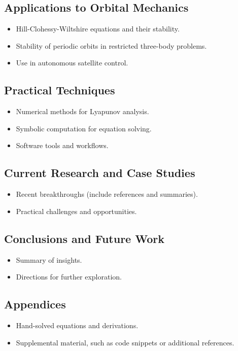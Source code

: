 \documentclass[11pt]{article}
\begin{document}
\subsection{Applications to Orbital Mechanics}
\begin{itemize}
    \item Hill-Clohessy-Wiltshire equations and their stability.
    \item Stability of periodic orbits in restricted three-body problems.
    \item Use in autonomous satellite control.
\end{itemize}

\subsection{Practical Techniques}
\begin{itemize}
    \item Numerical methods for Lyapunov analysis.
    \item Symbolic computation for equation solving.
    \item Software tools and workflows.
\end{itemize}

\subsection{Current Research and Case Studies}
\begin{itemize}
    \item Recent breakthroughs (include references and summaries).
    \item Practical challenges and opportunities.
\end{itemize}

\subsection{Conclusions and Future Work}
\begin{itemize}
    \item Summary of insights.
    \item Directions for further exploration.
\end{itemize}

\subsection{Appendices}
\begin{itemize}
    \item Hand-solved equations and derivations.
    \item Supplemental material, such as code snippets or additional references.
\end{itemize}
\end{document}
